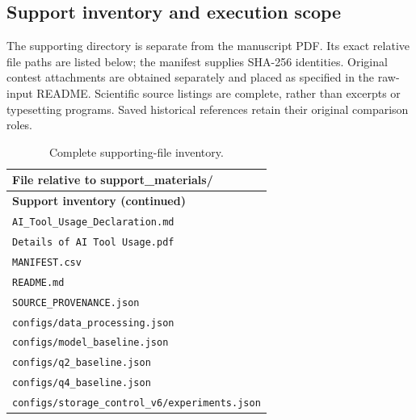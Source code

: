 \subsection*{Support inventory and execution scope}

The supporting directory is separate from the manuscript PDF. Its exact relative file paths are listed below; the manifest supplies SHA-256 identities. Original contest attachments are obtained separately and placed as specified in the raw-input README. Scientific source listings are complete, rather than excerpts or typesetting programs. Saved historical references retain their original comparison roles.

\begingroup\footnotesize

\begin{longtable}{p{}}

\caption{Complete supporting-file inventory.}\label{tab:37} \\

\textbf{File relative to support\_materials/} \\ \hline

\endfirsthead

\textbf{Support inventory (continued)} \\ \hline

\endhead

\nolinkurl{AI_Tool_Usage_Declaration.md} \\

\nolinkurl{Details of AI Tool Usage.pdf} \\

\nolinkurl{MANIFEST.csv} \\

\nolinkurl{README.md} \\

\nolinkurl{SOURCE_PROVENANCE.json} \\

\nolinkurl{configs/data_processing.json} \\

\nolinkurl{configs/model_baseline.json} \\

\nolinkurl{configs/q2_baseline.json} \\

\nolinkurl{configs/q4_baseline.json} \\

\nolinkurl{configs/storage_control_v6/experiments.json} \\


\end{longtable}

